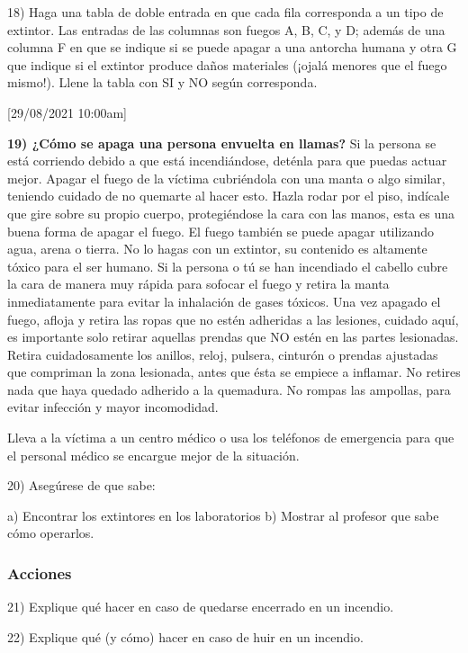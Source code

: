 \documentclass[letterpaper,11pt]{article}
\begin{document}
18) Haga una tabla de doble entrada en que cada fila corresponda a un tipo de extintor.
Las entradas de las columnas son fuegos A, B, C, y D; además de una columna F en que se indique si se puede apagar a una antorcha humana y otra G que indique si el extintor produce daños materiales (¡ojalá menores que el fuego mismo!). Llene la tabla con SI y NO según corresponda.

[29/08/2021 10:00am]

\textbf{19) ¿Cómo se apaga una persona envuelta en llamas?}
Si la persona se está corriendo debido a que está incendiándose, deténla para que puedas actuar mejor.
Apagar el fuego de la víctima cubriéndola con una manta o algo similar, teniendo cuidado de no quemarte al hacer esto.
Hazla rodar por el piso, indícale que gire sobre su propio cuerpo, protegiéndose la cara con las manos, esta es una buena forma de apagar el fuego.
El fuego también se puede apagar utilizando agua, arena o tierra. No lo hagas con un extintor, su contenido es altamente tóxico para el ser humano.
Si la persona o tú se han incendiado el cabello cubre la cara de manera muy rápida para sofocar el fuego y retira la manta inmediatamente para evitar la inhalación de gases tóxicos.
Una vez apagado el fuego, afloja y retira las ropas que no estén adheridas a las lesiones, cuidado aquí, es importante solo retirar aquellas prendas que NO estén en las partes lesionadas.
Retira cuidadosamente los anillos, reloj, pulsera, cinturón o prendas ajustadas que compriman la zona lesionada, antes que ésta se empiece a inflamar. No retires nada que haya quedado adherido a la quemadura. No rompas las ampollas, para evitar infección y mayor incomodidad.

Lleva a la víctima a un centro médico o usa los teléfonos de emergencia para que el personal médico se encargue mejor de la situación.


20) Asegúrese de que sabe:

a) Encontrar los extintores en los laboratorios
b) Mostrar al profesor que sabe cómo operarlos.

\subsubsection{Acciones} 
21) Explique qué hacer en caso de quedarse encerrado en un incendio.

22) Explique qué (y cómo) hacer en caso de huir en un incendio.
\end{document}
